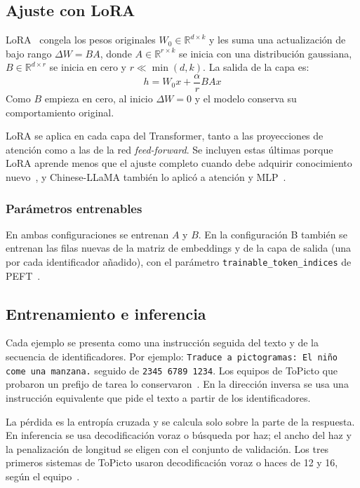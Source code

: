 \subsection{Ajuste con LoRA}
LoRA~\citep{hu2021lora} congela los pesos originales $W_0 \in \mathbb{R}^{d \times k}$ y les suma una actualización de bajo rango $\Delta W = BA$, donde $A \in \mathbb{R}^{r \times k}$ se inicia con una distribución gaussiana, $B \in \mathbb{R}^{d \times r}$ se inicia en cero y $r \ll \min(d,k)$. La salida de la capa es:
\begin{equation}
h = W_0x + \frac{\alpha}{r}BAx
\end{equation}
Como $B$ empieza en cero, al inicio $\Delta W = 0$ y el modelo conserva su comportamiento original.

LoRA se aplica en cada capa del Transformer, tanto a las proyecciones de atención como a las de la red \textit{feed-forward}. Se incluyen estas últimas porque LoRA aprende menos que el ajuste completo cuando debe adquirir conocimiento nuevo~\citep{biderman2024lora}, y Chinese-LLaMA también lo aplicó a atención y MLP~\citep{cui2023efficient}.

\subsubsection{Parámetros entrenables}
En ambas configuraciones se entrenan $A$ y $B$. En la configuración B también se entrenan las filas nuevas de la matriz de embeddings y de la capa de salida (una por cada identificador añadido), con el parámetro \texttt{trainable\_token\_indices} de PEFT~\citep{peft}.

\subsection{Entrenamiento e inferencia}
Cada ejemplo se presenta como una instrucción seguida del texto y de la secuencia de identificadores. Por ejemplo: \texttt{Traduce a pictogramas: El niño come una manzana.} seguido de \texttt{2345 6789 1234}. Los equipos de ToPicto que probaron un prefijo de tarea lo conservaron~\citep{Sudharshan2026,GuzmanColomina2026}. En la dirección inversa se usa una instrucción equivalente que pide el texto a partir de los identificadores.

La pérdida es la entropía cruzada y se calcula solo sobre la parte de la respuesta. En inferencia se usa decodificación voraz o búsqueda por haz; el ancho del haz y la penalización de longitud se eligen con el conjunto de validación. Los tres primeros sistemas de ToPicto usaron decodificación voraz o haces de 12 y 16, según el equipo~\citep{Sudharshan2026,GuzmanColomina2026,Gokul2026}.

